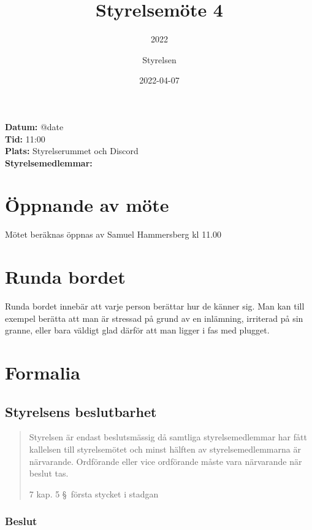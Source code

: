 \documentclass[protokoll]{dvd}
\begin{document}
\title{Styrelsemöte 4}
\subtitle{2022}
\author{Styrelsen}
\date{2022-04-07}

\textbf{Datum:} \csname @date\endcsname\\
\textbf{Tid:} 11:00\\
\textbf{Plats:} Styrelserummet och Discord\\
\textbf{Styrelsemedlemmar:}
\begin{närvarande_förtroendevalda}
\end{närvarande_förtroendevalda}


\section{Öppnande av möte}

Mötet beräknas öppnas av Samuel Hammersberg kl 11.00

\section{Runda bordet}

Runda bordet innebär att varje person berättar hur de känner sig.
Man kan till exempel berätta att man är stressad på grund av en inlämning, irriterad på sin granne, eller bara väldigt glad därför att man ligger i fas med plugget.

\newpage

\section{Formalia}

\subsection{Styrelsens beslutbarhet}

\blockquote[7 kap. 5 \S~första stycket i stadgan][]{%
    Styrelsen är endast beslutsmässig då samtliga styrelsemedlemmar har fått kallelsen till styrelsemötet och minst hälften av styrelsemedlemmarna är närvarande.
    Ordförande eller vice ordförande måste vara närvarande när beslut tas.
}

\subsubsection{Beslut}
\end{document}
